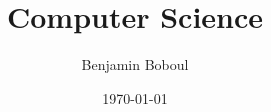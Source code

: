 \documentclass[11pt]{memoir}
\title{Computer Science}
\author{Benjamin Boboul}
\date{\today}
\begin{document}
    \frontmatter
    \maketitle

    \mainmatter
    

    \backmatter
    \tableofcontents
    \listoffigures
    \listoftables
    \printglossaries
\end{document}
